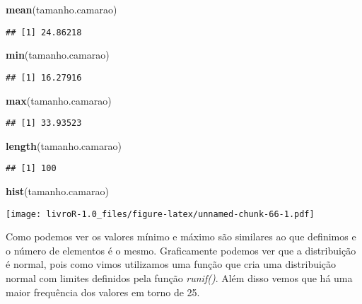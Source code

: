 \documentclass[]{book}
\newenvironment{Shaded}{\begin{snugshade}}{\end{snugshade}}
\newcommand{\KeywordTok}[1]{\textcolor[rgb]{0.13,0.29,0.53}{\textbf{#1}}}
\newcommand{\NormalTok}[1]{#1}
\begin{document}
\begin{Shaded}
\begin{Highlighting}[]
\KeywordTok{mean}\NormalTok{(tamanho.camarao)}
\end{Highlighting}
\end{Shaded}

\begin{verbatim}
## [1] 24.86218
\end{verbatim}

\begin{Shaded}
\begin{Highlighting}[]
\KeywordTok{min}\NormalTok{(tamanho.camarao)}
\end{Highlighting}
\end{Shaded}

\begin{verbatim}
## [1] 16.27916
\end{verbatim}

\begin{Shaded}
\begin{Highlighting}[]
\KeywordTok{max}\NormalTok{(tamanho.camarao)}
\end{Highlighting}
\end{Shaded}

\begin{verbatim}
## [1] 33.93523
\end{verbatim}

\begin{Shaded}
\begin{Highlighting}[]
\KeywordTok{length}\NormalTok{(tamanho.camarao)}
\end{Highlighting}
\end{Shaded}

\begin{verbatim}
## [1] 100
\end{verbatim}

\begin{Shaded}
\begin{Highlighting}[]
\KeywordTok{hist}\NormalTok{(tamanho.camarao)}
\end{Highlighting}
\end{Shaded}

\texttt{[image: livroR-1.0\_files/figure-latex/unnamed-chunk-66-1.pdf]}

Como podemos ver os valores mínimo e máximo são similares ao que definimos e o número de elementos é o mesmo. Graficamente podemos ver que a distribuição é normal, pois como vimos utilizamos uma função que cria uma distribuição normal com limites definidos pela função \emph{runif()}. Além disso vemos que há uma maior frequência dos valores em torno de 25.
\end{document}
